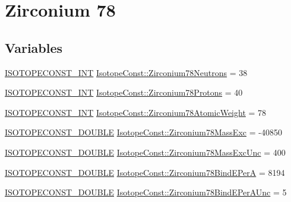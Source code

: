 \hypertarget{group___isotope_const-_zirconium-_zr78}{}\section{Zirconium 78}
\label{group___isotope_const-_zirconium-_zr78}
\subsection*{Variables}
\begin{DoxyCompactItemize}
\item 
\mbox{\hyperlink{group___isotope_const-_macros_ga5f18360b3e99483a35c32d789e62621c}{I\+S\+O\+T\+O\+P\+E\+C\+O\+N\+S\+T\+\_\+\+I\+NT}} \mbox{\hyperlink{group___isotope_const-_zirconium-_zr78_gaed14ad932fd54f66b1da6baace36225b}{Isotope\+Const\+::\+Zirconium78\+Neutrons}} = 38
\item 
\mbox{\hyperlink{group___isotope_const-_macros_ga5f18360b3e99483a35c32d789e62621c}{I\+S\+O\+T\+O\+P\+E\+C\+O\+N\+S\+T\+\_\+\+I\+NT}} \mbox{\hyperlink{group___isotope_const-_zirconium-_zr78_ga1bafad9482c66d9319949a6b41672702}{Isotope\+Const\+::\+Zirconium78\+Protons}} = 40
\item 
\mbox{\hyperlink{group___isotope_const-_macros_ga5f18360b3e99483a35c32d789e62621c}{I\+S\+O\+T\+O\+P\+E\+C\+O\+N\+S\+T\+\_\+\+I\+NT}} \mbox{\hyperlink{group___isotope_const-_zirconium-_zr78_gab5b3b448cd6bdaece222e007bcc90597}{Isotope\+Const\+::\+Zirconium78\+Atomic\+Weight}} = 78
\item 
\mbox{\hyperlink{group___isotope_const-_macros_ga8f45a7272ce02c0b4c65c44636ed719a}{I\+S\+O\+T\+O\+P\+E\+C\+O\+N\+S\+T\+\_\+\+D\+O\+U\+B\+LE}} \mbox{\hyperlink{group___isotope_const-_zirconium-_zr78_gac478dace1e64cf69471926db795f33c3}{Isotope\+Const\+::\+Zirconium78\+Mass\+Exc}} = -\/40850
\item 
\mbox{\hyperlink{group___isotope_const-_macros_ga8f45a7272ce02c0b4c65c44636ed719a}{I\+S\+O\+T\+O\+P\+E\+C\+O\+N\+S\+T\+\_\+\+D\+O\+U\+B\+LE}} \mbox{\hyperlink{group___isotope_const-_zirconium-_zr78_gac327d20f48e733330db860091ce073ae}{Isotope\+Const\+::\+Zirconium78\+Mass\+Exc\+Unc}} = 400
\item 
\mbox{\hyperlink{group___isotope_const-_macros_ga8f45a7272ce02c0b4c65c44636ed719a}{I\+S\+O\+T\+O\+P\+E\+C\+O\+N\+S\+T\+\_\+\+D\+O\+U\+B\+LE}} \mbox{\hyperlink{group___isotope_const-_zirconium-_zr78_ga49aaab1ff9fda666dc3e090dd4aa12e7}{Isotope\+Const\+::\+Zirconium78\+Bind\+E\+PerA}} = 8194
\item 
\mbox{\hyperlink{group___isotope_const-_macros_ga8f45a7272ce02c0b4c65c44636ed719a}{I\+S\+O\+T\+O\+P\+E\+C\+O\+N\+S\+T\+\_\+\+D\+O\+U\+B\+LE}} \mbox{\hyperlink{group___isotope_const-_zirconium-_zr78_gaa4cd1f6d2b85875c097f8dc63d82ee9d}{Isotope\+Const\+::\+Zirconium78\+Bind\+E\+Per\+A\+Unc}} = 5

\end{DoxyCompactItemize}
